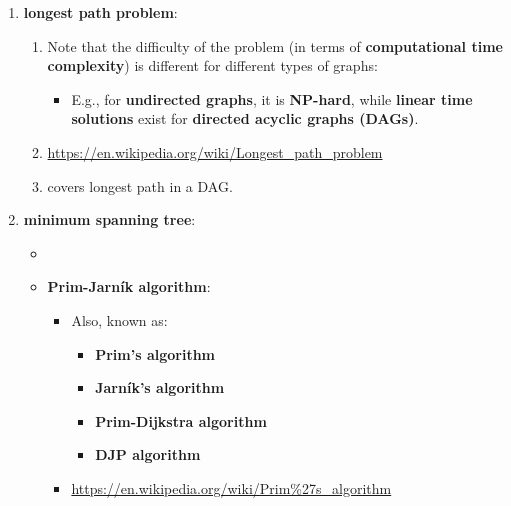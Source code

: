 \begin{enumerate}
\begin{enumerate}
\begin{enumerate}
\begin{enumerate}
\begin{itemize}
				\end{itemize}
			\end{enumerate}
		\item \cite[\S6]{Cormen2013}
		\item \cite[\S13.5]{Goodrich2011}
		\item \cite[\S14.6]{Goodrich2013}
		\end{enumerate}
	\item {\bf longest path problem}: \vspace{-0.2cm}
		\begin{enumerate} \itemsep -2pt
		\item Note that the difficulty of the problem (in terms of {\bf computational time complexity}) is different for different types of graphs: \vspace{-0.1cm}
			\begin{itemize} \itemsep -1pt
			\item E.g., for {\bf undirected graphs}, it is {\bf NP-hard}, while {\bf linear time solutions} exist for {\bf directed acyclic graphs (DAGs)}.
			\end{itemize}
		\item \url{https://en.wikipedia.org/wiki/Longest_path_problem}
		\item \cite[\S5, pp. 80--85]{Cormen2013} covers longest path in a DAG.
		\end{enumerate}
	\item {\bf minimum spanning tree}: \vspace{-0.2cm}
		\begin{itemize} \itemsep -2pt
		\item \item {\bf Prim-Jarn{\'{i}}k algorithm}: \vspace{-0.1cm}
			\begin{itemize} \itemsep -1pt
			\item Also, known as: \vspace{-0.1cm}
				\begin{itemize} \itemsep -1pt
				\item {\bf Prim's algorithm}
				\item {\bf Jarn{\'{i}}k's algorithm}
				\item {\bf Prim-Dijkstra algorithm}
				\item {\bf DJP algorithm}
				\end{itemize}
			\item \url{https://en.wikipedia.org/wiki/Prim%27s_algorithm}
			\end{itemize}

\end{itemize}
\end{enumerate}
\end{enumerate}
